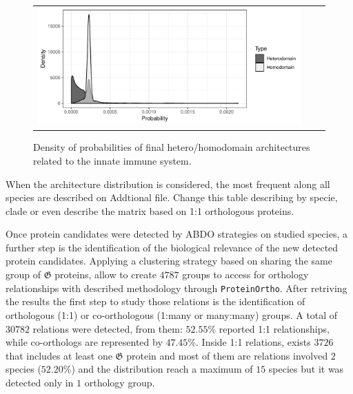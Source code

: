 \documentclass[11pt]{article}
\newcommand{\TODO}[1]{\begingroup\color{red}#1\endgroup}
\begin{document}

\begin{figure}
  \begin{tabular}{lcr}
    \begin{minipage}{0.6\textwidth}
    \centering
    \includegraphics[scale=0.6]{figures/distr_bigrams_complete} 
    \end{minipage}
    & \qquad &
    \begin{minipage}{0.35\textwidth}
    \caption{Density of probabilities of final hetero/homodomain architectures related to the
  innate immune system.}\label{fig:probArch}
    \end{minipage}
  \end{tabular}
\end{figure}

\TODO{When the architecture distribution is considered, the most frequent along 
	all species are described on Addtional file. Change this table 
	describing by specie, clade or even describe the matrix based on 1:1 
	orthologous proteins.
}

Once protein candidates were detected by ABDO strategies on studied species, 
a further step is the identification of the biological relevance of the 
new detected protein candidates. Applying a clustering strategy 
based on sharing the same group of $\boldsymbol{\mathfrak{G}}$ proteins,
allow to create $4787$ groups to access for orthology relationships with 
described methodology through \texttt{ProteinOrtho}. After retriving the
results the first step to study those relations is the identification of 
orthologous (1:1) or co-orthologous (1:many or many:many) groups. 
A total of $30782$ relations were detected, from them: $52.55$\% reported 1:1 
relationships, while co-orthologs are represented by $47.45$\%. Inside 1:1 relations, 
exists $3726$ that includes at least one $\boldsymbol{\mathfrak{G}}$ protein 
and most of them are relations involved $2$ species ($52.20$\%) and 
the distribution reach a maximum of $15$ species but it was detected only 
in $1$ orthology group. 
\end{document}
